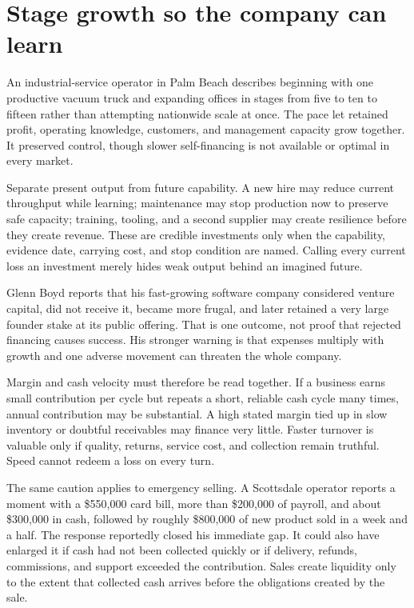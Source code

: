 \section{Stage growth so the company can learn}

An industrial-service operator in Palm Beach describes beginning with one
productive vacuum truck and expanding offices in stages from five to ten to
fifteen rather than attempting nationwide scale at once. The pace let retained
profit, operating knowledge, customers, and management capacity grow together.
It preserved control, though slower self-financing is not available or optimal
in every market.

Separate present output from future capability. A new hire may reduce current
throughput while learning; maintenance may stop production now to preserve safe
capacity; training, tooling, and a second supplier may create resilience before
they create revenue. These are credible investments only when the capability,
evidence date, carrying cost, and stop condition are named. Calling every current
loss an investment merely hides weak output behind an imagined future.

Glenn Boyd reports that his fast-growing software company considered venture
capital, did not receive it, became more frugal, and later retained a very large
founder stake at its public offering. That is one outcome, not proof that
rejected financing causes success. His stronger warning is that expenses
multiply with growth and one adverse movement can threaten the whole company.

Margin and cash velocity must therefore be read together. If a business earns
small contribution per cycle but repeats a short, reliable cash cycle many
times, annual contribution may be substantial. A high stated margin tied up in
slow inventory or doubtful receivables may finance very little. Faster turnover
is valuable only if quality, returns, service cost, and collection remain
truthful. Speed cannot redeem a loss on every turn.

The same caution applies to emergency selling. A Scottsdale operator reports a
moment with a \$550,000 card bill, more than \$200,000 of payroll, and about
\$300,000 in cash, followed by roughly \$800,000 of new product sold in a week
and a half. The response reportedly closed his immediate gap. It could also
have enlarged it if cash had not been collected quickly or if delivery,
refunds, commissions, and support exceeded the contribution. Sales create
liquidity only to the extent that collected cash arrives before the obligations
created by the sale.

